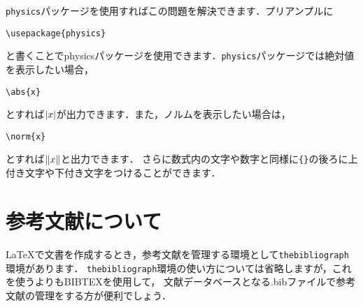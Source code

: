 \documentclass[a4paper,11pt,titlepage]{jsarticle}
\numberwithin{equation}{section}
\theoremstyle{definition}
\begin{document}
\verb|physics|パッケージを使用すればこの問題を解決できます．プリアンプルに
\begin{center}
    \verb|\usepackage{physics}|
\end{center}
と書くことでphysicsパッケージを使用できます．\verb|physics|パッケージでは絶対値を表示したい場合，
\begin{center}
    \verb|\abs{x}|
\end{center}
とすれば$\abs{x}$が出力できます．また，ノルムを表示したい場合は，
\begin{center}
    \verb|\norm{x}|
\end{center}
とすれば$\norm{x}$と出力できます．
さらに数式内の文字や数字と同様に\verb|{}|の後ろに上付き文字や下付き文字をつけることができます．


\newpage

\section{参考文献について}

\LaTeX で文書を作成するとき，参考文献を管理する環境として\verb|thebibliograph|環境があります．
\verb|thebibliograph|環境の使い方については省略しますが，これを使うよりもBIBTEXを使用して，
文献データベースとなる.bibファイルで参考文献の管理をする方が便利でしょう．

\newpage



\end{document}
